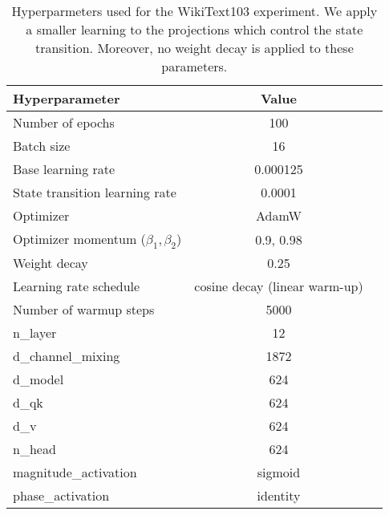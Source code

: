 \documentclass{article} \usepackage{iclr2024_conference,times}
\begin{document}
\begin{table}[H]
    \caption{Hyperparmeters used for the WikiText103 experiment. We apply a smaller learning to the projections which control the state transition. Moreover, no weight decay is applied to these parameters.}
    \centering
    \begin{tabular}{lcc}
        \toprule
        Hyperparameter & Value \\
        \midrule
        Number of epochs & 100 \\
        Batch size & 16 \\
        Base learning rate & 0.000125 \\
        State transition learning rate & 0.0001 \\
        Optimizer & AdamW \\
        Optimizer momentum ($\beta_1, \beta_2$) & 0.9, 0.98 \\
        Weight decay & 0.25 \\
        Learning rate schedule & cosine decay (linear warm-up) \\
        Number of warmup steps & 5000 \\
        \midrule
        n\_layer & 12 \\
        d\_channel\_mixing & 1872 \\
        d\_model & 624 \\
        d\_qk & 624 \\
        d\_v & 624 \\
        n\_head & 624 \\
        magnitude\_activation & sigmoid \\
        phase\_activation & identity \\
        \bottomrule
    \end{tabular}
    \label{table:general_hparams}
\end{table}
\end{document}
